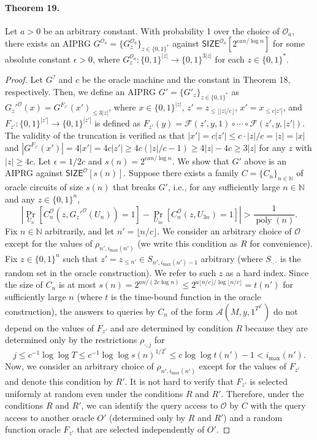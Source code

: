 \documentclass[10pt,a4paper]{article}
\begin{document}
\paragraph{Theorem 19.}
Let $a>0$ be an arbitrary constant. With probability 1 over the choice of $\mathcal O_a$, there exists an AIPRG $G^{\mathcal O_a}=\{G_z^{\mathcal O_a}\}_{z\in\{0,1\}^*}$ against $\mathsf{SIZE}^{\mathcal O_a}[2^{\epsilon an/\log n}]$ for some absolute constant $\epsilon>0$, where $G_z^{\mathcal O_a}:\{0,1\}^{|z|}\to\{0,1\}^{3|z|}$ for each $z\in\{0,1\}^*$.
\begin{proof}
Let $G^?$ and $c$ be the oracle machine and the constant in Theorem 18, respectively. Then, we define an AIPRG $G'=\{G'_z\}_{z\in\{0,1\}^*}$ as $G_z'^{\mathcal O}(x)=G^{F_{z'}}(x')_{\leq3|z|}$, where $x\in\{0,1\}^{|z|}$, $z'=z_{\leq\lfloor|z|/c\rfloor}$, $x'=x_{\leq c|z'|}$, and $F_{z'}:\{0,1\}^{|z'|}\to\{0,1\}^{|z'|}$ is defined as $F_{z'}(y)=\mathcal F(z',y,1)\circ\cdots\circ\mathcal F(z',y,|z'|)$. The validity of the truncation is verified as that $|x'|=c|z'|\leq c\cdot|z|/c=|z|=|x|$ and $|G^{F_{z'}}(x')|=4|x'|=4c|z'|\geq4c(|z|/c-1)\geq4|z|-4c\geq3|z|$ for any $z$ with $|z|\geq4c$.
Let $\epsilon=1/2c$ and $s(n)=2^{\epsilon an/\log n}$. We show that $G'$ above is an AIPRG against $\mathsf{SIZE}^{\mathcal O}[s(n)]$. Suppose there exists a family $C=\{C_n\}_{n\in\mathbb N}$ of oracle circuits of size $s(n)$ that breaks $G'$, i.e., for any sufficiently large $n\in\mathbb N$ and any $z\in\{0,1\}^n$,
\[\left|\Pr_{U_n}[C_n^{\mathcal O}(z,G_z'^{\mathcal O}(U_n))=1]-\Pr_{U_{3n}}[C_n^{\mathcal O}(z,U_{3n})=1]\right|>\frac1{\operatorname{poly}(n)}.\]
Fix $n\in\mathbb N$ arbitrarily, and let $n'=\lfloor n/c\rfloor$. We consider an arbitrary choice of $\mathcal O$ except for the values of $\rho_{n',i_{\max}(n')}$ (we write this condition as $R$ for convenience). Fix $z\in\{0,1\}^n$ such that $z'=z_{\leq n'}\in S_{n',i_{\max}(n')-1}$ arbitrary (where $S_{\cdot,\cdot}$ is the random set in the oracle construction). We refer to such $z$ as a hard index.
Since the size of $C_n$ is at most $s(n)=2^{an/(2c\log n)}\leq2^{a\lfloor n/c\rfloor/\log\lfloor n/c\rfloor}=t(n')$ for sufficiently large $n$ (where $t$ is the time-bound function in the oracle construction), the answers to queries by $C_n$ of the form $\mathcal A(M,y,1^{T^{2^c}})$ do not depend on the values of $F_{z'}$ and are determined by condition $R$ because they are determined only by the restrictions $\rho_{\cdot,j}$ for
\[j\leq c^{-1}\log\log T\leq c^{-1}\log\log s(n)^{1/2^c}\leq c\log\log t(n')-1<i_{\max}(n').\]
Now, we consider an arbitrary choice of $\rho_{n',i_{\max}(n')}$ except for the values of $F_{z'}$ and denote this condition by $R'$. It is not hard to verify that $F_{z'}$ is selected uniformly at random even under the conditions $R$ and $R'$. Therefore, under the conditions $R$ and $R'$, we can identify the query access to $\mathcal O$ by $C$ with the query access to another oracle $O'$ (determined only by $R$ and $R'$) and a random function oracle $F_{z'}$ that are selected independently of $O'$.

\end{proof}
\end{document}
